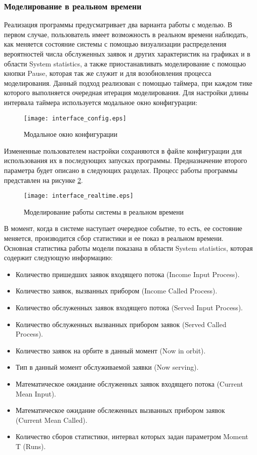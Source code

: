 \subsubsection{Моделирование в реальном времени}
Реализация программы предусматривает два варианта работы с моделью. В первом случае, пользователь имеет возможность в реальном времени наблюдать, как меняется состояние системы с помощью визуализации распределения вероятностей числа обслуженных заявок и других характеристик на графиках и в области System statistics, а также приостанавливать моделирование с помощью кнопки Pause, которая так же служит и для возобновления процесса моделирования. Данный подход реализован с помощью таймера, при каждом тике которого выполняется очередная итерация моделирования. Для настройки длины интервала таймера используется модальное окно конфигурации:
\begin{figure}[H]
	\centering
	\texttt{[image: interface\_config.eps]}
	\caption{Модальное окно конфигурации}
	\label{interface_config}
\end{figure}
Измененные пользователем настройки сохраняются в файле конфигурации для использования их в последующих запусках программы. Предназначение второго параметра будет описано в следующих разделах.
	Процесс работы программы представлен на рисунке \ref{interface_realtime}.
   \begin{figure}[H]
	\centering
	\texttt{[image: interface\_realtime.eps]}
	\caption{Моделирование работы системы в реальном времени}
	\label{interface_realtime}
\end{figure}
В момент, когда в системе наступает очередное событие, то есть, ее состояние меняется, производится сбор статистики и ее показ в реальном времени. Основная статистика работы модели показана в области System statistics, которая содержит следующую информацию:
\begin{itemize}
	\item Количество пришедших заявок входящего потока (Income Input Process).
	\item Количество заявок, вызванных прибором (Income Called Process).
	\item Количество обслуженных заявок входящего потока (Served Input Process).
	\item Количество обслуженных вызванных прибором заявок (Served Called Process).
	\item Количество заявок на орбите в данный момент (Now in orbit).
	\item Тип в данный момент обслуживаемой заявки (Now serving).
	\item Математическое ожидание обслуженных заявок входящего потока (Current Mean Input).
	\item Математическое ожидание обслеженных вызванных прибором заявок (Current Mean Called).
	\item Количество сборов статистики, интервал которых задан параметром Moment T (Runs).
\end{itemize}

